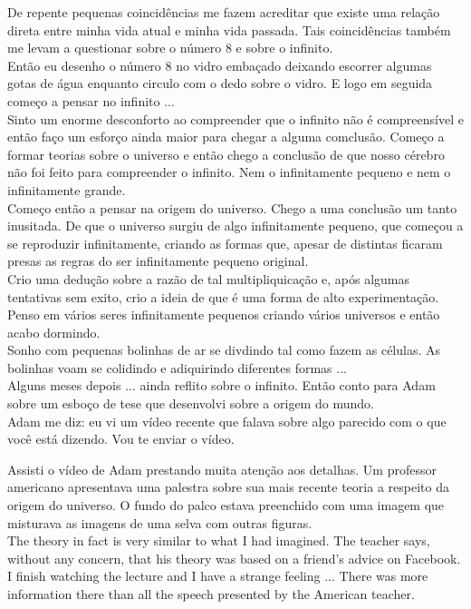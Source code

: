 \documentclass[11pt]{book}
\begin{document}
\noindent De repente pequenas coincidências me fazem acreditar que existe uma relação direta entre minha vida atual e minha vida passada. Tais coincidências também me levam a questionar sobre o número 8 e sobre o infinito. \\

\noindent Então eu desenho o número 8 no vidro embaçado deixando escorrer algumas gotas de água enquanto circulo com o dedo sobre o vidro. E logo em seguida começo a pensar no infinito ... \\

\noindent Sinto um enorme desconforto ao compreender que o infinito não é compreensível e então faço um esforço ainda maior para chegar a alguma comclusão. Começo a formar teorias sobre o universo e então chego a conclusão de que nosso cérebro não foi feito para compreender o infinito. Nem o infinitamente pequeno e nem o infinitamente grande. \\

\noindent Começo então a pensar na origem do universo. Chego a uma conclusão um tanto inusitada. De que o universo surgiu de algo infinitamente pequeno, que começou a se reproduzir infinitamente, criando as formas que, apesar de distintas ficaram presas as regras do ser infinitamente pequeno original. \\

\noindent Crio uma dedução sobre a razão de tal multipliquicação e, após algumas tentativas sem exito, crio a ideia de que é uma forma de alto experimentação. \\

\noindent Penso em vários seres infinitamente pequenos criando vários universos e então acabo dormindo. \\

\noindent Sonho com pequenas bolinhas de ar se divdindo tal como fazem as células. As bolinhas voam se colidindo e adiquirindo diferentes formas ...  \\

\noindent Alguns meses depois ... ainda reflito sobre o infinito. Então conto para Adam sobre um esboço de tese que desenvolvi sobre a origem do mundo. \\

\noindent Adam me diz: eu vi um vídeo recente que falava sobre algo parecido com o que você está dizendo. Vou te enviar o vídeo.

\noindent Assisti o vídeo de Adam prestando muita atenção aos detalhas. Um professor americano apresentava uma palestra sobre sua mais recente teoria a respeito da origem do universo. O fundo do palco estava preenchido com uma imagem que misturava as imagens de uma selva com outras figuras. \\

\noindent The theory in fact is very similar to what I had imagined. The teacher says, without any concern, that his theory was based on a friend's advice on Facebook. \\

\noindent I finish watching the lecture and I have a strange feeling ... There was more information there than all the speech presented by the American teacher.
\end{document}
